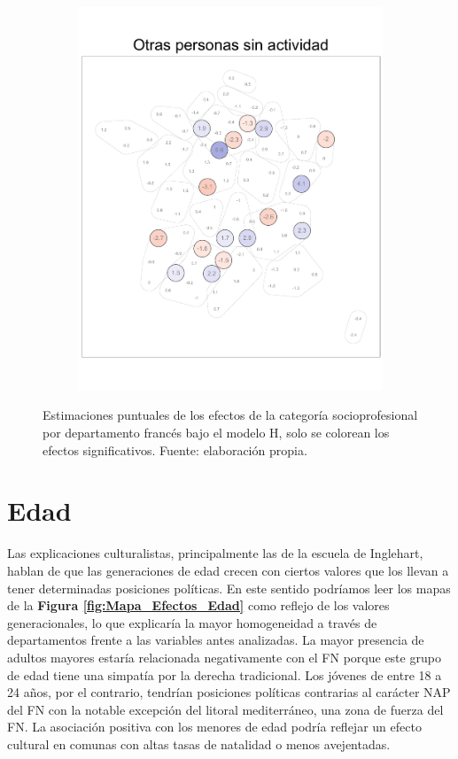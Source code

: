\begin{figure}
\begin{subfigure}{0.235\textwidth}
	\includegraphics[width = \textwidth]{Figs/Efectos/Dorling_Efectos_CSP8_Modelo_H}
	\end{subfigure}
	\caption{Estimaciones puntuales de los efectos de la categoría socioprofesional por departamento francés bajo el modelo H, solo se colorean los efectos significativos. Fuente: elaboración propia.}
	\label{fig:Dorling_Efectos_Cat_Socioprof}
\end{figure}


\section{Edad}

Las explicaciones culturalistas, principalmente las de la escuela de Inglehart, hablan de que las generaciones de edad crecen con ciertos valores que los llevan a tener determinadas posiciones políticas. En este sentido podríamos leer los mapas de la \textbf{Figura \ref{fig:Mapa_Efectos_Edad}} como reflejo de los valores generacionales, lo que explicaría la mayor homogeneidad a través de departamentos frente a las variables antes analizadas. La mayor presencia de adultos mayores estaría relacionada negativamente con el FN porque este grupo de edad tiene una simpatía por la derecha tradicional. Los jóvenes de entre 18 a 24 años, por el contrario, tendrían posiciones políticas contrarias al carácter NAP del FN con la notable excepción del litoral mediterráneo, una zona de fuerza del FN. La asociación positiva con los menores de edad podría reflejar un efecto cultural en comunas con altas tasas de natalidad o menos avejentadas.\\

